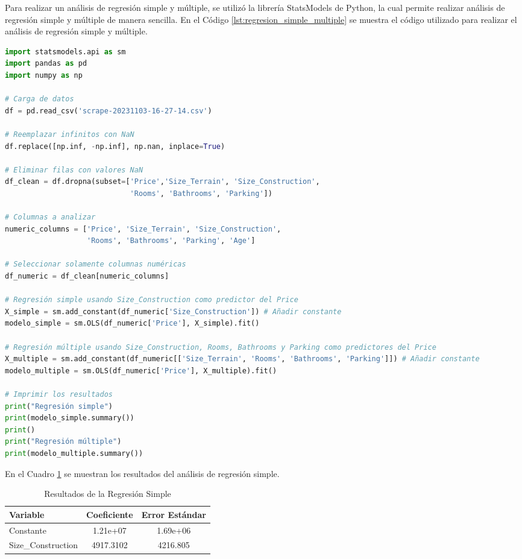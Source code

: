 Para realizar un análisis de regresión simple y múltiple, se utilizó la librería
StatsModels de Python, la cual permite realizar análisis de regresión simple y
múltiple de manera sencilla. En el Código \ref{lst:regresion_simple_multiple} se
muestra el código utilizado para realizar el análisis de regresión simple y múltiple.

\begin{lstlisting}[language=Python, label=lst:regresion_simple_multiple, caption=Regresión simple y múltiple.]
import statsmodels.api as sm
import pandas as pd
import numpy as np

# Carga de datos
df = pd.read_csv('scrape-20231103-16-27-14.csv')

# Reemplazar infinitos con NaN
df.replace([np.inf, -np.inf], np.nan, inplace=True)

# Eliminar filas con valores NaN
df_clean = df.dropna(subset=['Price','Size_Terrain', 'Size_Construction',
                             'Rooms', 'Bathrooms', 'Parking'])

# Columnas a analizar
numeric_columns = ['Price', 'Size_Terrain', 'Size_Construction',
                   'Rooms', 'Bathrooms', 'Parking', 'Age']

# Seleccionar solamente columnas numéricas
df_numeric = df_clean[numeric_columns]

# Regresión simple usando Size_Construction como predictor del Price
X_simple = sm.add_constant(df_numeric['Size_Construction']) # Añadir constante
modelo_simple = sm.OLS(df_numeric['Price'], X_simple).fit()

# Regresión múltiple usando Size_Construction, Rooms, Bathrooms y Parking como predictores del Price
X_multiple = sm.add_constant(df_numeric[['Size_Terrain', 'Rooms', 'Bathrooms', 'Parking']]) # Añadir constante
modelo_multiple = sm.OLS(df_numeric['Price'], X_multiple).fit()

# Imprimir los resultados
print("Regresión simple")
print(modelo_simple.summary())
print()
print("Regresión múltiple")
print(modelo_multiple.summary())
\end{lstlisting}

En el Cuadro \ref{table:regresion_simple} se muestran los resultados del análisis
de regresión simple.

\begin{table}[ht!]
\centering
\caption{Resultados de la Regresión Simple}
\label{table:regresion_simple}
\begin{tabular}{
  l
  S[table-format=-1.4]
  S[table-format=1.4]
}
\toprule
{Variable} & {Coeficiente} & {Error Estándar} \\
\midrule
Constante              & 1.21e+07 & 1.69e+06 \\
Size\_Construction & 4917.3102 & 4216.805 \\
\bottomrule
\end{tabular}
\end{table}

